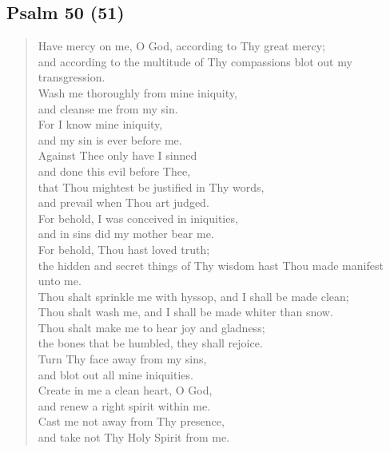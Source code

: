 {		\subsection*{Psalm 50 (51)}
			\begin{verse}
				Have mercy on me, O God, according to Thy great mercy;\nolinebreak\\
				and according to the multitude of Thy compassions blot out my transgression.\nolinebreak\\
				Wash me thoroughly from mine iniquity,\nolinebreak\\
				and cleanse me from my sin.\nolinebreak\\
				For I know mine iniquity,\nolinebreak\\
				and my sin is ever before me.\nolinebreak\\
				Against Thee only have I sinned\nolinebreak\\
				and done this evil before Thee,\nolinebreak\\
				that Thou mightest be justified in Thy words,\nolinebreak\\
				and prevail when Thou art judged.\nolinebreak\\
				For behold, I was conceived in iniquities,\nolinebreak\\
				and in sins did my mother bear me.\nolinebreak\\
				For behold, Thou hast loved truth;\nolinebreak\\
				the hidden and secret things of Thy wisdom hast Thou made manifest unto me.\nolinebreak\\
				Thou shalt sprinkle me with hyssop, and I shall be made clean;\nolinebreak\\
				Thou shalt wash me, and I shall be made whiter than snow.\nolinebreak\\
				Thou shalt make me to hear joy and gladness;\nolinebreak\\
				the bones that be humbled, they shall rejoice.\nolinebreak\\
				Turn Thy face away from my sins,\nolinebreak\\
				and blot out all mine iniquities.\nolinebreak\\
				Create in me a clean heart, O God,\nolinebreak\\
				and renew a right spirit within me.\nolinebreak\\
				Cast me not away from Thy presence,\nolinebreak\\
				and take not Thy Holy Spirit from me.\nolinebreak\\

\end{verse}}
